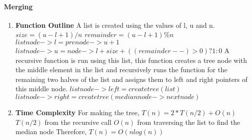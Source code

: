 \documentclass[a4paper,11pt]{article}
\begin{document}
\paragraph{Merging}
\begin{enumerate}
	\item \textbf{Function Outline}\newline
	A list is created using the values of l, u and n.\newline
	$size=(u-l+1)/n$\newline
	$remainder=(u-l+1)\%n$\newline
	$listnode->l=prenode->u+1$\newline
	$listnode->u=node->l+size+((remainder--)>0)?1:0$\newline
	A recursive function is run using this list, this function creates a tree node with the middle element in the list and recursively runs the function for the remaining two halves of the list and assigns them to left and right pointers of this middle node.\newline
	$listnode->left=createtree(list)$\newline
	$listnode->right=createtree(mediannode->nextnode)$\newline
	
	\item \textbf{Time Complexity}\newline
	For making the tree,\newline
	$T(n)=2*T(n/2)+O(n)$\newline
	$T(n/2)$ from the recursive call\newline
	$O(n)$ from traversing the list to find the median node\newline 
	Therefore, $T(n)=O(nlog(n))$
	
\end{enumerate}
\end{document}
